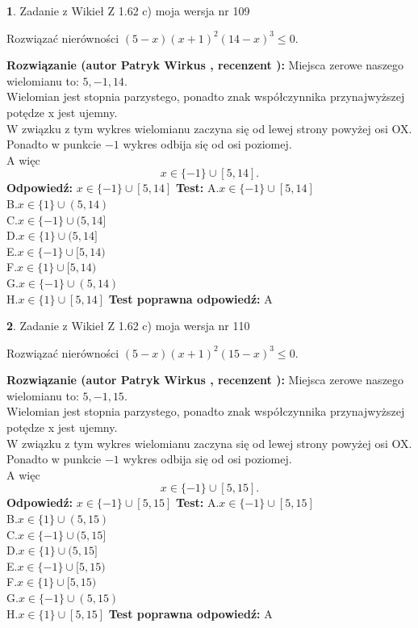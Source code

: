 \documentclass[12pt, a4paper]{article}
\theoremstyle{definition} %
\newtheorem{zad}{}
\newcommand{\zadStart}[1]{\begin{zad}#1\newline}
\newcommand{\zadStop}{\end{zad}}
\newcommand{\rozwStart}[2]{\noindent \textbf{Rozwiązanie (autor #1 , recenzent #2): }\newline}
\newcommand{\rozwStop}{\newline}
\newcommand{\odpStart}{\noindent \textbf{Odpowiedź:}\newline}
\newcommand{\odpStop}{\newline}
\newcommand{\testStart}{\noindent \textbf{Test:}\newline}
\newcommand{\testStop}{\newline}
\newcommand{\kluczStart}{\noindent \textbf{Test poprawna odpowiedź:}\newline}
\newcommand{\kluczStop}{\newline}
\begin{document}
\zadStart{Zadanie z Wikieł Z 1.62 c) moja wersja nr 109}

Rozwiązać nierówności $(5-x)(x+1)^{2}(14-x)^{3}\le0$.
\zadStop
\rozwStart{Patryk Wirkus}{}
Miejsca zerowe naszego wielomianu to: $5, -1, 14$.\\
Wielomian jest stopnia parzystego, ponadto znak współczynnika przy\linebreak najwyższej potędze x jest ujemny.\\ W związku z tym wykres wielomianu zaczyna się od lewej strony powyżej osi OX.\\
Ponadto w punkcie $-1$ wykres odbija się od osi poziomej.\\
A więc $$x \in \{-1\} \cup [5,14].$$
\rozwStop
\odpStart
$x \in \{-1\} \cup [5,14]$
\odpStop
\testStart
A.$x \in \{-1\} \cup [5,14]$\\
B.$x \in \{1\} \cup (5,14)$\\
C.$x \in \{-1\} \cup (5,14]$\\
D.$x \in \{1\} \cup (5,14]$\\
E.$x \in \{-1\} \cup [5,14)$\\
F.$x \in \{1\} \cup [5,14)$\\
G.$x \in \{-1\} \cup (5,14)$\\
H.$x \in \{1\} \cup [5,14]$
\testStop
\kluczStart
A
\kluczStop



\zadStart{Zadanie z Wikieł Z 1.62 c) moja wersja nr 110}

Rozwiązać nierówności $(5-x)(x+1)^{2}(15-x)^{3}\le0$.
\zadStop
\rozwStart{Patryk Wirkus}{}
Miejsca zerowe naszego wielomianu to: $5, -1, 15$.\\
Wielomian jest stopnia parzystego, ponadto znak współczynnika przy\linebreak najwyższej potędze x jest ujemny.\\ W związku z tym wykres wielomianu zaczyna się od lewej strony powyżej osi OX.\\
Ponadto w punkcie $-1$ wykres odbija się od osi poziomej.\\
A więc $$x \in \{-1\} \cup [5,15].$$
\rozwStop
\odpStart
$x \in \{-1\} \cup [5,15]$
\odpStop
\testStart
A.$x \in \{-1\} \cup [5,15]$\\
B.$x \in \{1\} \cup (5,15)$\\
C.$x \in \{-1\} \cup (5,15]$\\
D.$x \in \{1\} \cup (5,15]$\\
E.$x \in \{-1\} \cup [5,15)$\\
F.$x \in \{1\} \cup [5,15)$\\
G.$x \in \{-1\} \cup (5,15)$\\
H.$x \in \{1\} \cup [5,15]$
\testStop
\kluczStart
A
\kluczStop
\end{document}
